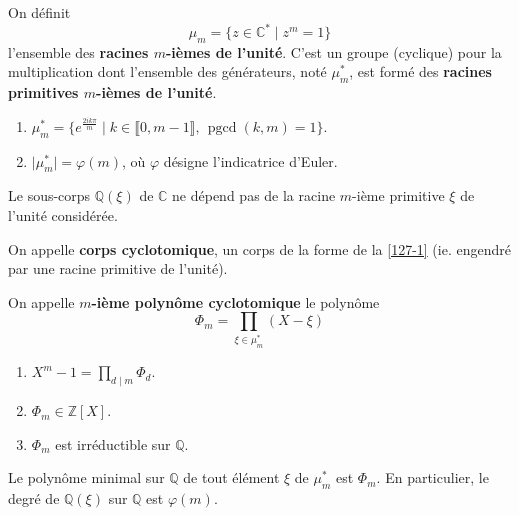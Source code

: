   \begin{definition}
    On définit
    \[ \mu_m = \{ z \in \mathbb{C}^* \mid z^m = 1 \} \]
    l'ensemble des \textbf{racines $m$-ièmes de l'unité}. C'est un groupe (cyclique) pour la multiplication dont l'ensemble des générateurs, noté $\mu_m^*$, est formé des \textbf{racines primitives $m$-ièmes de l'unité}.
  \end{definition}

  \begin{proposition}
    \begin{enumerate}[label=(\roman*)]
      \item $\mu_m^* = \{ e^{\frac{2ik\pi}{m}} \mid k \in \llbracket 0, m-1 \rrbracket, \, \operatorname{pgcd}(k, m) = 1 \}$.
      \item $\vert \mu_m^* \vert = \varphi(m)$, où $\varphi$ désigne l'indicatrice d'Euler.
    \end{enumerate}
  \end{proposition}

  \begin{proposition}
    \label{127-1}
    Le sous-corps $\mathbb{Q}(\xi)$ de $\mathbb{C}$ ne dépend pas de la racine $m$-ième primitive $\xi$ de l'unité considérée.
  \end{proposition}

  \begin{definition}
    On appelle \textbf{corps cyclotomique}, un corps de la forme de la \cref{127-1} (ie. engendré par une racine primitive de l'unité).
  \end{definition}

  \begin{definition}
    On appelle \textbf{$m$-ième polynôme cyclotomique} le polynôme
    \[ \Phi_m = \prod_{\xi \in \mu_m^*} (X - \xi) \]
  \end{definition}

  \begin{theorem}
    \begin{enumerate}[label=(\roman*)]
      \item $X^m - 1 = \prod_{d \mid m} \Phi_d$.
      \item $\Phi_m \in \mathbb{Z}[X]$.
      \item $\Phi_m$ est irréductible sur $\mathbb{Q}$.
    \end{enumerate}
  \end{theorem}

  \begin{corollary}
    Le polynôme minimal sur $\mathbb{Q}$ de tout élément $\xi$ de $\mu_m^*$ est $\Phi_m$. En particulier, le degré de $\mathbb{Q}(\xi)$ sur $\mathbb{Q}$ est $\varphi(m)$.
  \end{corollary}

